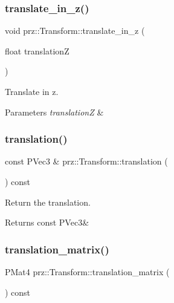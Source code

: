 \subsubsection{\texorpdfstring{translate\_in\_z()}{translate\_in\_z()}}
{\footnotesize\ttfamily void prz\+::\+Transform\+::translate\+\_\+in\+\_\+z (\begin{DoxyParamCaption}\item[{float}]{translationZ }\end{DoxyParamCaption})}



Translate in z. 


\begin{DoxyParams}{Parameters}
{\em translationZ} & \\
\hline
\end{DoxyParams}
\mbox{\label{classprz_1_1_transform_ab23448e27c3d383e9e494c1518058ee8}} 
\subsubsection{\texorpdfstring{translation()}{translation()}}
{\footnotesize\ttfamily const P\+Vec3 \& prz\+::\+Transform\+::translation (\begin{DoxyParamCaption}{ }\end{DoxyParamCaption}) const}



Return the translation. 

\begin{DoxyReturn}{Returns}
const P\+Vec3\& 
\end{DoxyReturn}
\mbox{\label{classprz_1_1_transform_a987d7f508f84c41ce41d38c7d29ab1a2}} 
\subsubsection{\texorpdfstring{translation\_matrix()}{translation\_matrix()}}
{\footnotesize\ttfamily P\+Mat4 prz\+::\+Transform\+::translation\+\_\+matrix (\begin{DoxyParamCaption}{ }\end{DoxyParamCaption}) const}



